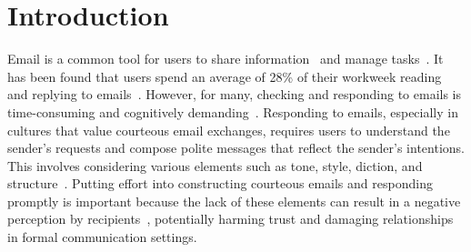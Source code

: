 \section{Introduction}
Email is a common tool for users to share information~\cite{Nelson2011Mail2Tag, whittaker2006email} and manage tasks~\cite{bellotti2005quality}. 
It has been found that users spend an average of 28\% of their workweek reading and replying to emails~\cite{McKinseySocialEconomy}.
However, for many, checking and responding to emails is time-consuming and cognitively demanding~\cite{mark2016email}. 
Responding to emails, especially in cultures that value courteous email exchanges, requires users to understand the sender's requests and compose polite messages that reflect the sender's intentions. 
This involves considering various elements such as tone, style, diction, and structure~\cite{Chen2015Chinese}.
Putting effort into constructing courteous emails and responding promptly is important because the lack of these elements can result in a negative perception by recipients~\cite{Resendes2012Send, vignovic2010computer, yoram2011online}, potentially harming trust and damaging relationships in formal communication settings. 

